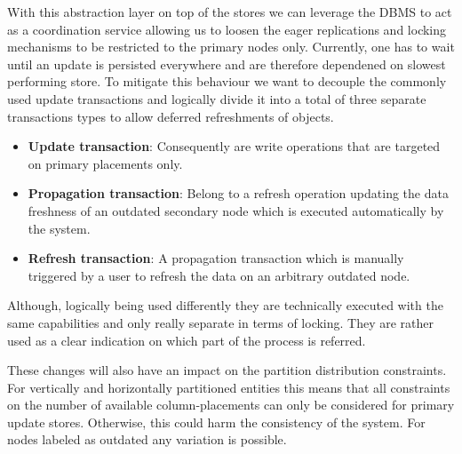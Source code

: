 With this abstraction layer on top of the stores we can leverage the DBMS to act as a coordination service allowing us to loosen the eager replications and 
locking mechanisms to be restricted to the primary nodes only. Currently, one has to wait until an update is persisted everywhere and are therefore
dependened on slowest performing store.
To mitigate this behaviour we want to decouple the commonly used update transactions and logically divide it into a total of three separate transactions types
to allow deferred refreshments of objects.
\begin{itemize}
    \item \textbf{Update transaction}: Consequently are write operations that are targeted on primary placements only.
    \item \textbf{Propagation transaction}: Belong to a refresh operation updating the data freshness of an outdated secondary node which is 
    executed automatically by the system.
    \item \textbf{Refresh transaction}: A propagation transaction which is manually triggered by a user to refresh the data on an arbitrary outdated node.
\end{itemize}

Although, logically being used differently they are technically executed with the same capabilities and only really separate in terms of locking.
They are rather used as a clear indication on which part of the process is referred.

These changes will also have an impact on the partition distribution constraints. For vertically and horizontally partitioned 
entities this means that all constraints on the number of available column-placements can only be considered for primary update stores. Otherwise, this could harm
the consistency of the system. For nodes labeled as outdated any variation is possible.




